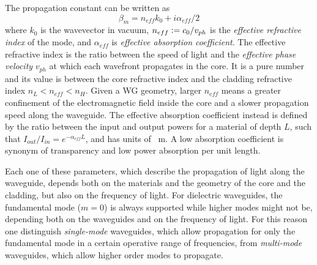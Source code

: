 The propagation constant can be written as
\begin{equation}
\beta_m = n_{eff} k_0 + i \alpha_{eff}/2
\end{equation}
where $k_0$ is the wavevector in vacuum, $n_{eff} \vcentcolon= c_0/v_{ph}$ is the \textit{effective refractive index} of the mode, and $\alpha_{eff}$ is \textit{effective absorption coefficient}.
The effective refractive index is the ratio between the speed of light and the \textit{effective phase velocity} $v_{ph}$ at which each wavefront propagates in the core.
It is a pure number and its value is between the core refractive index and the cladding refractive index $n_L < n_{eff} < n_H$.
Given a \acl{WG} geometry, larger $n_{eff}$ means a greater confinement of the electromagnetic field inside the core and a slower propagation speed along the waveguide.
The effective absorption coefficient instead is defined by the ratio between the input and output powers for a material of depth $L$, such that $I_{out}/I_{in}=e^{-\alpha_{eff}L}$, and has units of \si{\per\m}.
A low absorption coefficient is synonym of transparency and low power absorption per unit length.



Each one of these parameters, which describe the propagation of light along the waveguide, depends both on the materials and the geometry of the core and the cladding, but also on the frequency of light.
For dielectric waveguides, the fundamental mode ($m=0$) is always supported while higher modes might not be, depending both on the waveguides and on the frequency of light.
For this reason one distinguish \textit{single-mode} waveguides, which allow propagation for only the fundamental mode in a certain operative range of frequencies, from \textit{multi-mode} waveguides, which allow higher order modes to propagate.

